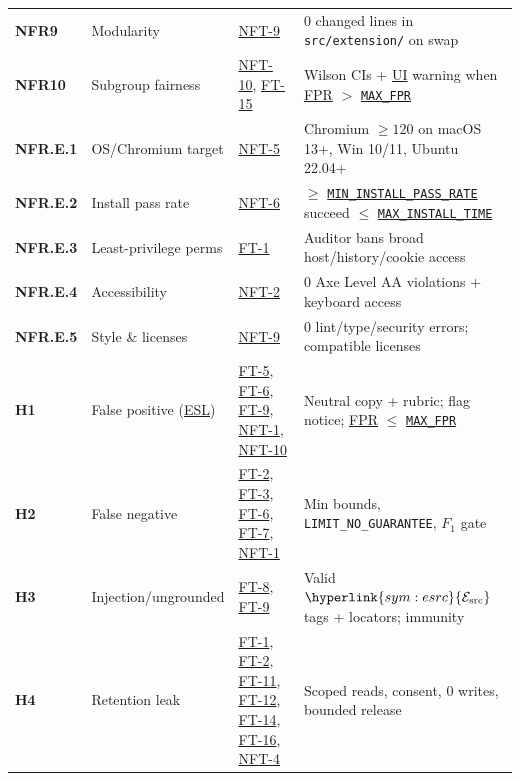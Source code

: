 \documentclass[12pt, titlepage]{article}
\newcommand{\MaxFPR}{\hyperref[const:MAX_FPR]{\texttt{MAX\_\allowbreak{}FPR}}}
\newcommand{\MaxInstallTime}{\hyperref[const:MAX_INSTALL_TIME]{\texttt{MAX\_\allowbreak{}INSTALL\_\allowbreak{}TIME}}}
\newcommand{\MinInstallPassRate}{\hyperref[const:MIN_INSTALL_PASS_RATE]{\texttt{MIN\_\allowbreak{}INSTALL\_\allowbreak{}PASS\_\allowbreak{}RATE}}}
\newcommand{\SymEsrc}{\hyperlink{sym:esrc}{\mathcal{E}_{\text{src}}}}
\newcommand{\ESL}{\hyperlink{vnv-acr-esl}{ESL}}
\newcommand{\FPR}{\hyperlink{vnv-acr-fpr}{FPR}}
\newcommand{\UI}{\hyperlink{vnv-acr-ui}{UI}}
\begin{document}
\begin{tabularx}{\textwidth}{P{1.9cm} P{3.7cm} P{3.5cm} Y}
\label{req:NFR9}\textbf{NFR9} & Modularity & \hyperref[test:NFT-9]{NFT-9} & 0 changed lines in \texttt{src/\allowbreak{}extension/} on swap\\
\label{req:NFR10}\textbf{NFR10} & Subgroup fairness & \hyperref[test:NFT-10]{NFT-10}, \hyperref[test:FT-15]{FT-15} & Wilson CIs + \UI{} warning when \FPR{} $>$ \MaxFPR{}\\
\midrule
{}\label{req:NFR.E.1}\textbf{NFR.E.1} & OS/Chromium target & \hyperref[test:NFT-5]{NFT-5} & Chromium $\ge 120$ on macOS 13+, Win 10/11, Ubuntu 22.04+\\
\label{req:NFR.E.2}\textbf{NFR.E.2} & Install pass rate & \hyperref[test:NFT-6]{NFT-6} & $\ge$ \MinInstallPassRate{} succeed $\le$ \MaxInstallTime{}\\
\label{req:NFR.E.3}\textbf{NFR.E.3} & Least-privilege perms & \hyperref[test:FT-1]{FT-1} & Auditor bans broad host/history/cookie access\\
\label{req:NFR.E.4}\textbf{NFR.E.4} & Accessibility & \hyperref[test:NFT-2]{NFT-2} & 0 Axe Level AA violations + keyboard access\\
\label{req:NFR.E.5}\textbf{NFR.E.5} & Style \& licenses & \hyperref[test:NFT-9]{NFT-9} & 0 lint/type/security errors; compatible licenses\\
\midrule
{}\label{haz:H1}\textbf{H1} & False positive (\ESL{}) & \hyperref[test:FT-5]{FT-5}, \hyperref[test:FT-6]{FT-6}, \hyperref[test:FT-9]{FT-9}, \hyperref[test:NFT-1]{NFT-1}, \hyperref[test:NFT-10]{NFT-10} & Neutral copy + rubric; flag notice; \FPR{} $\le$ \MaxFPR{}\\
\label{haz:H2}\textbf{H2} & False negative & \hyperref[test:FT-2]{FT-2}, \hyperref[test:FT-3]{FT-3}, \hyperref[test:FT-6]{FT-6}, \hyperref[test:FT-7]{FT-7}, \hyperref[test:NFT-1]{NFT-1} & Min bounds, \texttt{LIMIT\_\allowbreak{}NO\_\allowbreak{}GUARANTEE}, $F_1$ gate\\
\label{haz:H3}\textbf{H3} & Injection/ungrounded & \hyperref[test:FT-8]{FT-8}, \hyperref[test:FT-9]{FT-9} & Valid $\SymEsrc$ tags + locators; immunity\\
\label{haz:H4}\textbf{H4} & Retention leak & \hyperref[test:FT-1]{FT-1}, \hyperref[test:FT-2]{FT-2}, \hyperref[test:FT-11]{FT-11}, \hyperref[test:FT-12]{FT-12}, \hyperref[test:FT-14]{FT-14}, \hyperref[test:FT-16]{FT-16}, \hyperref[test:NFT-4]{NFT-4} & Scoped reads, consent, 0 writes, bounded release\\

\end{tabularx}
\end{document}
